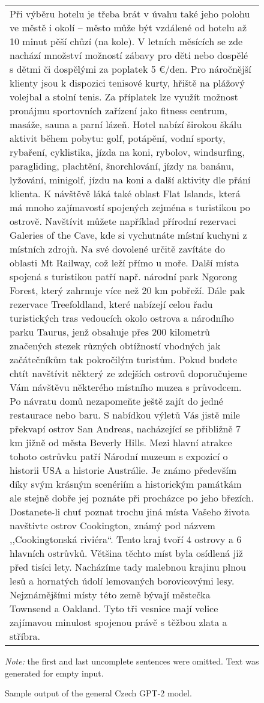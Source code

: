 \begin{figure}[htb]
        \centering
            \begin{tabular}{|l|}
\hline
\parbox{14cm}{\vspace{0.25em}Při výběru hotelu je třeba brát v úvahu také jeho polohu ve městě i okolí – město může být vzdálené od hotelu až 10 minut pěší chůzí (na kole). V letních měsících se zde nachází množství možností zábavy pro děti nebo dospělé s dětmi či dospělými za poplatek 5 €/den. Pro náročnější klienty jsou k dispozici tenisové kurty, hřiště na plážový volejbal a stolní tenis. Za příplatek lze využít možnost pronájmu sportovních zařízení jako fitness centrum, masáže, sauna a parní lázeň. Hotel nabízí širokou škálu aktivit během pobytu: golf, potápění, vodní sporty, rybaření, cyklistika, jízda na koni, rybolov, windsurfing, paragliding, plachtění, šnorchlování, jízdy na banánu, lyžování, minigolf, jízdu na koni a další aktivity dle přání klienta. K návštěvě láká také oblast Flat Islands, která má mnoho zajímavostí spojených zejména s turistikou po ostrově. Navštívit můžete například přírodní rezervaci Galeries of the Cave, kde si vychutnáte místní kuchyni z místních zdrojů. Na své dovolené určitě zavítáte do oblasti Mt Railway, což leží přímo u moře. Další místa spojená s turistikou patří např. národní park Ngorong Forest, který zahrnuje více než 20 km pobřeží. Dále pak rezervace Treefoldland, které nabízejí celou řadu turistických tras vedoucích okolo ostrova a národního parku Taurus, jenž obsahuje přes 200 kilometrů značených stezek různých obtížností vhodných jak začátečníkům tak pokročilým turistům. Pokud budete chtít navštívit některý ze zdejších ostrovů doporučujeme Vám návštěvu některého místního muzea s průvodcem. Po návratu domů nezapomeňte ještě zajít do jedné restaurace nebo baru. S nabídkou výletů Vás jistě mile překvapí ostrov San Andreas, nacházející se přibližně 7 km jižně od města Beverly Hills. Mezi hlavní atrakce tohoto ostrůvku patří Národní muzeum s expozicí o historii USA a historie Austrálie. Je známo především díky svým krásným scenériím a historickým památkám ale stejně dobře jej poznáte při procházce po jeho březích. Dostanete-li chuť poznat trochu jiná místa Vašeho života navštivte ostrov Cookington, známý pod názvem ,,Cookingtonská riviéra``. Tento kraj tvoří 4 ostrovy a 6 hlavních ostrůvků. Většina těchto míst byla osídlená již před tisíci lety. Nacházíme tady malebnou krajinu plnou lesů a hornatých údolí lemovaných borovicovými lesy. Nejznámějšími místy této země bývají městečka Townsend a Oakland. Tyto tři vesnice mají velice zajímavou minulost spojenou právě s těžbou zlata a stříbra.\vspace{0.25em}}
\\ \hline
             \end{tabular}
        \caption{Sample output of the general Czech GPT-2 model.}
	\label{fig01:gpt2GenExample}
\textit{Note:} the first and last uncomplete sentences were omitted. Text was generated for empty input.
\end{figure}

